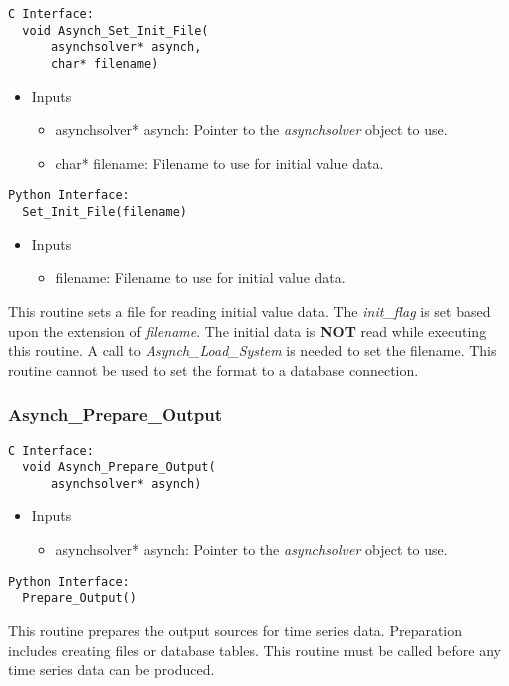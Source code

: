 \documentclass[12pt]{article}
\begin{document}
\begin{lstlisting}[style=CStyle]
  C Interface:
  void Asynch_Set_Init_File(
      asynchsolver* asynch,
      char* filename)
\end{lstlisting}
\begin{itemize}
 \item Inputs
  \begin{itemize}
   \item asynchsolver* asynch: Pointer to the \emph{asynchsolver} object to use.
   \item char* filename: Filename to use for initial value data.
  \end{itemize}
\end{itemize}
\begin{lstlisting}[style=PythonStyle]
  Python Interface:
  Set_Init_File(filename)
\end{lstlisting}
\begin{itemize}
 \item Inputs
  \begin{itemize}
   \item filename: Filename to use for initial value data.
  \end{itemize}
\end{itemize}
This routine sets a file for reading initial value data. The \emph{init\_flag} is set based upon the extension of \emph{filename}. The initial data is \textbf{NOT} read while executing this routine. A call to \emph{Asynch\_Load\_System} is needed to set the filename. This routine cannot be used to set the format to a database connection.



\subsubsection{Asynch\_Prepare\_Output} \label{sec: asynch_prepare_output}

\begin{lstlisting}[style=CStyle]
  C Interface:
  void Asynch_Prepare_Output(
      asynchsolver* asynch)
\end{lstlisting}
\begin{itemize}
 \item Inputs
  \begin{itemize}
   \item asynchsolver* asynch: Pointer to the \emph{asynchsolver} object to use.
  \end{itemize}
\end{itemize}
\begin{lstlisting}[style=PythonStyle]
  Python Interface:
  Prepare_Output()
\end{lstlisting}
This routine prepares the output sources for time series data. Preparation includes creating files or database tables. This routine must be called before any time series data can be produced.
\end{document}
